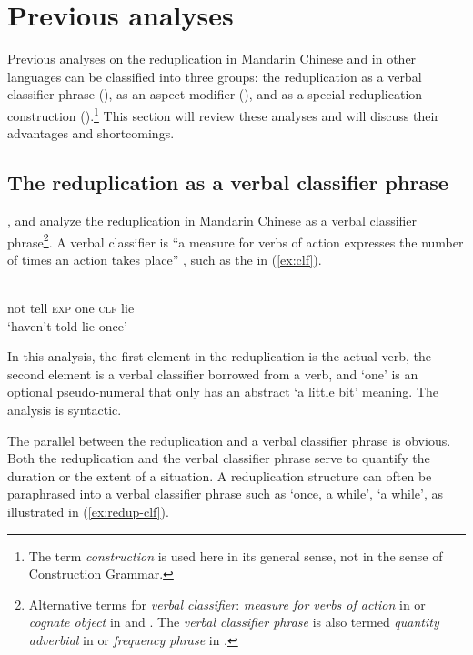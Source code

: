 \section{Previous analyses}\label{sec:prev}

Previous analyses on the reduplication in Mandarin Chinese and in other languages can be classified
into three groups:  the reduplication as a verbal classifier phrase (), as an aspect modifier (), and
as a special reduplication construction ().\footnote{The term \textit{construction} is used here in its general sense, not in the sense of Construction Grammar.} 
This section will review these analyses and will discuss their advantages and shortcomings.



\subsection{The reduplication as a verbal classifier phrase}\label{sec:clf}

\citet{Fan1964}, \citet[205]{Chao1968} and \citet{Xiong2016} analyze the reduplication in Mandarin Chinese
as a verbal classifier phrase\footnote{Alternative terms for \textit{verbal classifier}: \textit{measure for verbs of action} in \citet[615]{Chao1968} or \textit{cognate object} in \citet[312]{Chao1968} and  \citet[263]{Hong1999}.
The \textit{verbal classifier phrase}  is also termed \textit{quantity adverbial} in \citet[352--353]{LiThompson1981} or \textit{frequency phrase} in \citet[91]{Huangetal2009}.}.
A verbal classifier is ``a measure for verbs of action expresses the number of times an action takes place” \citep[615]{Chao1968}, such as the  in (\ref{ex:clf}). 

\ea\label{ex:clf}
\gll {}     \\
not tell \textsc{exp} one \textsc{clf} lie\\ \hfill {\citep[616]{Chao1968}}
\glt `haven't told lie once'
\z

In this analysis, the first element in the reduplication is the actual verb, 
the second element is a verbal classifier borrowed from a verb, 
and  `one' is an optional pseudo-numeral that only has an abstract `a little bit' meaning.
The analysis is syntactic.

The parallel between the reduplication and a verbal classifier phrase is obvious. 
Both the reduplication and the verbal classifier phrase serve to quantify the duration or the extent of a situation. 
A reduplication structure can often be paraphrased into a verbal classifier phrase such as   `once, a while',   `a while', as illustrated in (\ref{ex:redup-clf}).

